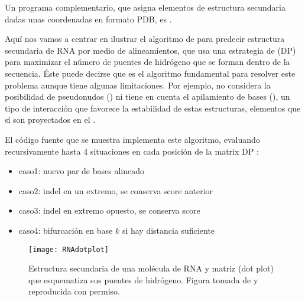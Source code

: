 Un programa complementario, que asigna elementos de estructura secundaria dadas unas coordenadas en formato PDB, es 
.

Aqu\'{i} nos vamos a centrar en ilustrar el algoritmo de \citet{Nussinov1978} para predecir estructura secundaria de RNA 
por medio de alineamientos, %
que usa una estrategia de 
 (DP)
para maximizar el n\'{u}mero de puentes de hidr\'{o}geno que se forman dentro de la secuencia. \'{E}ste puede decirse que es
el algoritmo fundamental para resolver este problema aunque tiene algunas limitaciones. Por ejemplo, no considera la posibilidad de 
pseudonudos () ni tiene en cuenta el 
apilamiento de bases (),
un tipo de interacci\'{o}n que favorece la estabilidad de estas estructuras, elementos que s\'{i} son proyectados en el
 \citep{dotu_ivan_2014_1066354}.

El c\'{o}digo fuente que se muestra implementa este algoritmo, 
evaluando recursivamente hasta 4 situaciones en cada posici\'{o}n de la matrix DP \citep{Eddy2004b}:
\begin{itemize}
\item caso1: nuevo par de bases alineado
\item caso2: indel en un extremo, se conserva score anterior
\item caso3: indel en extremo opuesto, se conserva score
\item caso4: bifurcaci\'{o}n en base $k$ si hay distancia suficiente 
\end{itemize}




\begin{figure}
\begin{center} 
\texttt{[image: RNAdotplot]}
\caption
{
Estructura secundaria de una mol\'{e}cula de RNA y matriz (dot plot) que esquematiza sus puentes de hidr\'{o}geno.
Figura tomada de \cite{Bernhart2006} y reproducida con permiso. 
}
\label{fig:RNAdotplot}
\end{center}
\end{figure}
